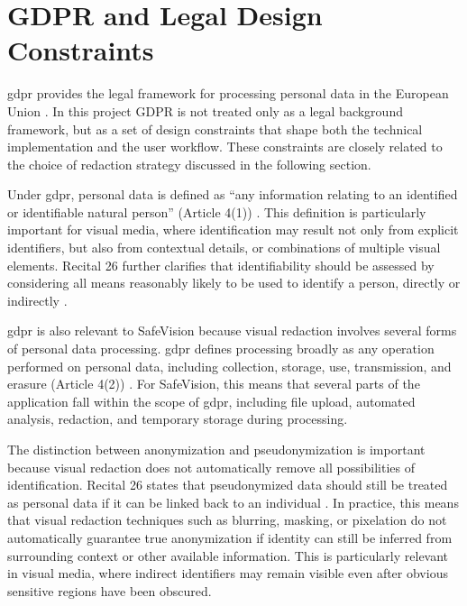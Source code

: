 
\section{GDPR and Legal Design Constraints}
\label{gdpr_and_legal_design_constraints}

\acrshort{gdpr} provides the legal framework for processing personal data in the European Union \cite{gdpr_guide}. In this project GDPR is not treated only as a legal background framework, but as a set of design constraints that shape both the technical implementation and the user workflow. These constraints are closely related to the choice of redaction strategy discussed in the following section.

Under \acrshort{gdpr}, personal data is defined as ``any information relating to an identified or identifiable natural person'' (Article 4(1)) \cite{gdpr}. This definition is particularly important for visual media, where identification may result not only from explicit identifiers, but also from contextual details, or combinations of multiple visual elements. Recital 26 further clarifies that identifiability should be assessed by considering all means reasonably likely to be used to identify a person, directly or indirectly \cite{gdpr}.

\acrshort{gdpr} is also relevant to \gls{SafeVision} because visual redaction involves several forms of personal data processing. \acrshort{gdpr} defines processing broadly as any operation performed on personal data, including collection, storage, use, transmission, and erasure (Article 4(2)) \cite{gdpr}. For \gls{SafeVision}, this means that several parts of the application fall within the scope of \acrshort{gdpr}, including file upload, automated analysis, redaction, and temporary storage during processing.

The distinction between \gls{anonymization} and pseudonymization is important because visual redaction does not automatically remove all possibilities of identification. Recital 26 states that pseudonymized data should still be treated as personal data if it can be linked back to an individual \cite{gdpr}. In practice, this means that visual redaction techniques such as blurring, \gls{masking}, or pixelation do not automatically guarantee true \gls{anonymization} if identity can still be inferred from surrounding context or other available information. This is particularly relevant in visual media, where indirect identifiers may remain visible even after obvious sensitive regions have been obscured.

